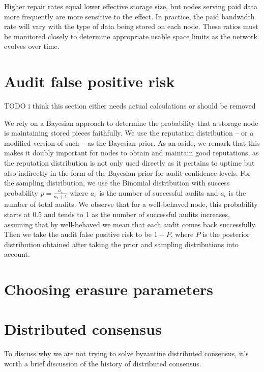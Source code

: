 \documentclass[11pt,fleqn,openany]{book}
\newcommand{\todo}[1]{{\color{red} TODO #1 }}
\begin{document}
Higher repair rates equal lower effective storage size, but nodes serving paid
data more frequently are more sensitive to the effect.
In practice, the paid bandwidth rate will vary with the type of data being
stored on each node.
These ratios must be monitored closely to determine appropriate usable space
limits as the network evolves over time.

\chapter{Audit false positive risk}\label{appendix:audit-false-positive}

\todo{i think this section either needs actual calculations or should be removed}

We rely on a Bayesian approach to determine the probability
that a storage node is maintaining stored pieces faithfully.
We use the reputation distribution -- or a modified version of such --
as the Bayesian prior. As an aside, we remark that this makes it doubly important
for nodes to obtain and maintain good reputations,
as the reputation distribution is not only used directly as it pertains to uptime
but also indirectly in the form of the Bayesian prior for audit confidence levels.
For the sampling distribution, we use the Binomial distribution with
success probability $p=\frac{a_s}{a_t+1}$ where $a_s$ is the number of
successful audits and $a_t$ is the number of total audits.
We observe that for a well-behaved node, this probability starts at 0.5
and tends to 1 as the number of successful audits increases,
assuming that by well-behaved we mean that each audit comes back successfully.
Then we take the audit false positive risk to be $1-P$,
where $P$ is the posterior distribution obtained after taking the
prior and sampling distributions into account.

\chapter{Choosing erasure parameters}
\label{appendix:RS}





\chapter{Distributed consensus}\label{chap:dist-consensus}

To discuss why we are not trying to solve byzantine distributed consensus,
it's worth a brief discussion of the history of distributed consensus.
\end{document}
